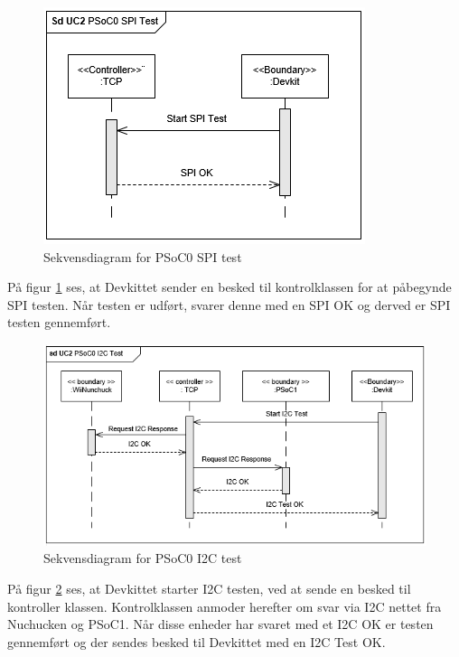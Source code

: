 \begin{figure}[H]
	\centering
	\includegraphics[width=.8\textwidth] {Systemarkitektur/images/SDPSoC0SPITest}
	\caption{Sekvensdiagram for PSoC0 SPI test}
	\label{fig:sekvensPSoC0SPITest}
\end{figure}

På figur \ref{fig:sekvensPSoC0SPITest} ses, at Devkittet sender en besked til kontrolklassen for at påbegynde SPI testen. Når testen er udført, svarer denne med en SPI OK og derved er SPI testen gennemført.

\begin{figure}[H]
	\centering
	\includegraphics[width=\textwidth] {Systemarkitektur/images/SDPSoC0I2CTest}
	\caption{Sekvensdiagram for PSoC0 I2C test}
	\label{fig:sekvensPSoC0I2CTest}
\end{figure}

På figur \ref{fig:sekvensPSoC0I2CTest} ses, at Devkittet starter I2C testen, ved at sende en besked til kontroller klassen. Kontrolklassen anmoder herefter om svar via I2C nettet fra Nuchucken og PSoC1. Når disse enheder har svaret med et I2C OK er testen gennemført og der sendes besked til Devkittet med en I2C Test OK.

